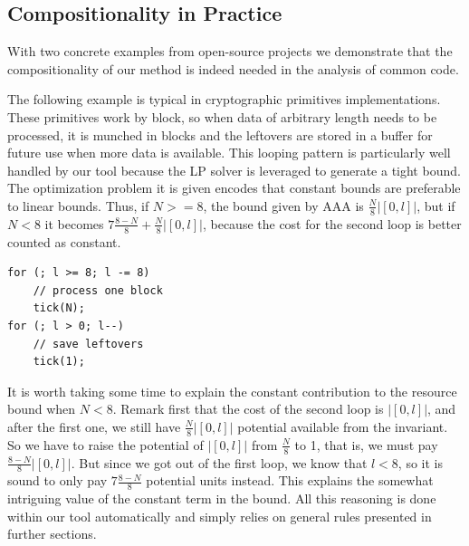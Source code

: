 \documentclass[nocopyrightspace,preprint]{sigplanconf}
\begin{document}

\subsection{Compositionality in Practice}

With two concrete examples from open-source projects we demonstrate
that the compositionality of our method is indeed needed in the
analysis of common code.


The following example is typical in cryptographic primitives
implementations.  These primitives work by block, so when data of
arbitrary length needs to be processed, it is munched in blocks and
the leftovers are stored in a buffer for future use when more data
is available.  This looping pattern is particularly well handled by
our tool because the LP solver is leveraged to generate a tight bound.
The optimization problem it is given encodes that constant bounds are
preferable to linear bounds.  Thus, if $N >= 8$, the bound given by
AAA is $\frac{N}{8} |[0,l]|$, but if $N<8$ it becomes $7\frac{8-N}{8}
+ \frac{N}{8}|[0,l]|$, because the cost for the second loop is better
counted as constant.
%
%
\begin{lstlisting}
for (; l >= 8; l -= 8)
    // process one block
    tick(N);
for (; l > 0; l--)
    // save leftovers
    tick(1);
\end{lstlisting}
%
It is worth taking some time to explain the constant contribution
to the resource bound when $N<8$.  Remark first that the cost of
the second loop is $|[0,l]|$, and after the first one, we still have
$\frac{N}{8}|[0,l]|$ potential available from the invariant.  So we have
to raise the potential of $|[0,l]|$ from $\frac{N}{8}$ to 1, that is,
we must pay $\frac{8-N}{8}|[0,l]|$.  But since we got out of the first
loop, we know that $l<8$, so it is sound to only pay $7\frac{8-N}{8}$
potential units instead.  This explains the somewhat intriguing value
of the constant term in the bound.  All this reasoning is done within
our tool automatically and simply relies on general rules presented
in further sections.
\end{document}
